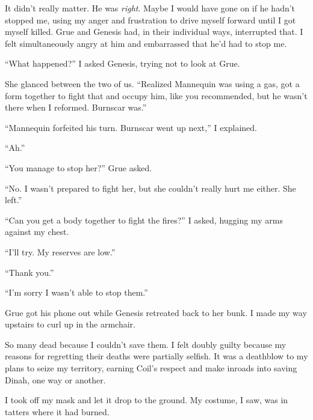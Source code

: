 It didn't really matter.  He was \emph{right}.  Maybe I would have gone on if he hadn't stopped me, using my anger and frustration to drive myself forward until I got myself killed.  Grue and Genesis had, in their individual ways, interrupted that.  I felt simultaneously angry at him and embarrassed that he'd had to stop me.



``What happened?'' I asked Genesis, trying not to look at Grue.



She glanced between the two of us.  ``Realized Mannequin was using a gas, got a form together to fight that and occupy him, like you recommended, but he wasn't there when I reformed.  Burnscar was.''



``Mannequin forfeited his turn.  Burnscar went up next,'' I explained.



``Ah.''



``You manage to stop her?''  Grue asked.



``No.  I wasn't prepared to fight her, but she couldn't really hurt me either.  She left.''



``Can you get a body together to fight the fires?'' I asked, hugging my arms against my chest.



``I'll try.  My reserves are low.''



``Thank you.''



``I'm sorry I wasn't able to stop them.''



Grue got his phone out while Genesis retreated back to her bunk.  I made my way upstairs to curl up in the armchair.



So many dead because I couldn't save them.  I felt doubly guilty because my reasons for regretting their deaths were partially selfish.  It was a deathblow to my plans to seize my territory, earning Coil's respect and make inroads into saving Dinah, one way or another.



I took off my mask and let it drop to the ground.  My costume, I saw, was in tatters where it had burned.



